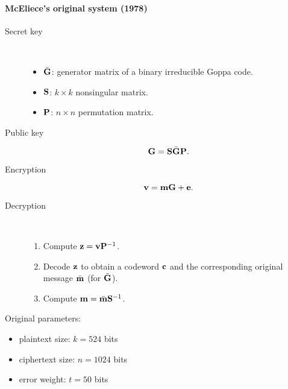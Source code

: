 \documentclass[a4paper, 11pt, openany]{book}
\begin{document}
\paragraph{McEliece's original system (1978)}
\begin{description}
\item[Secret key]~
\begin{itemize}
	\item $\bar{\bf G}$: generator matrix of a binary irreducible Goppa code.
	\item ${\bf S}$: $k \times k$ nonsingular matrix.
	\item ${\bf P}$: $n \times n$ permutation matrix.
\end{itemize}

\item[Public key]
\[
    {\bf G} = {\bf S}\bar{\bf G}{\bf P}.
\]

\item[Encryption]
\[
    {\bf v} = {\bf m}{\bf G} + {\bf e}.
\]

\item[Decryption]~
\begin{enumerate}
	\item Compute ${\bf z} = {\bf v} {\bf P}^{-1}$.
	\item Decode ${\bf z}$ to obtain a codeword ${\bf c}$ and the corresponding original message  $\bar{\bf m}$ (for $\bar{\bf G}$).
	\item Compute ${\bf m} = \bar{\bf m} {\bf S}^{-1}$.
\end{enumerate}
\end{description}

Original parameters:
\begin{itemize}
	\item plaintext size: $k=524$ bits

	\item ciphertext size: $n = 1024$ bits

	\item error weight: $t = 50$ bits
%
\end{itemize}








%
%
\end{document}
